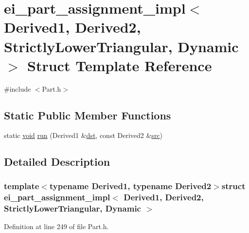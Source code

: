 \hypertarget{structei__part__assignment__impl_3_01_derived1_00_01_derived2_00_01_strictly_lower_triangular_00_01_dynamic_01_4}{\section{ei\-\_\-part\-\_\-assignment\-\_\-impl$<$ Derived1, Derived2, Strictly\-Lower\-Triangular, Dynamic $>$ Struct Template Reference}
\label{structei__part__assignment__impl_3_01_derived1_00_01_derived2_00_01_strictly_lower_triangular_00_01_dynamic_01_4}
}


{\ttfamily \#include $<$Part.\-h$>$}

\subsection*{Static Public Member Functions}
\begin{DoxyCompactItemize}
\item 
static \hyperlink{group___u_a_v_objects_plugin_ga444cf2ff3f0ecbe028adce838d373f5c}{void} \hyperlink{structei__part__assignment__impl_3_01_derived1_00_01_derived2_00_01_strictly_lower_triangular_00_01_dynamic_01_4_af0945d1b06f0baae9490463a72b0b995}{run} (Derived1 \&\hyperlink{glext_8h_a92034251bfd455d524a9b5610cddba00}{dst}, const Derived2 \&\hyperlink{glext_8h_a72e0fdf0f845ded60b1fada9e9195cd7}{src})
\end{DoxyCompactItemize}


\subsection{Detailed Description}
\subsubsection*{template$<$typename Derived1, typename Derived2$>$struct ei\-\_\-part\-\_\-assignment\-\_\-impl$<$ Derived1, Derived2, Strictly\-Lower\-Triangular, Dynamic $>$}



Definition at line 249 of file Part.\-h.



